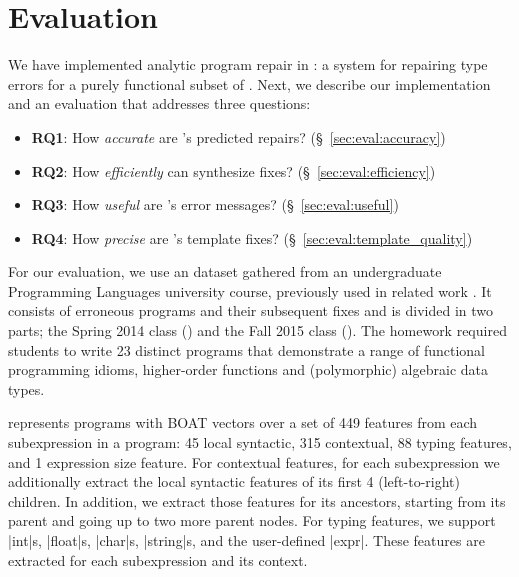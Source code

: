 \section{Evaluation}
\label{sec:eval}

\lstMakeShortInline[mathescape=true]{|}

We have implemented analytic program repair in \toolname: a system for
repairing type errors for a purely functional subset of \ocaml. Next,
we describe our implementation and an evaluation that addresses three
questions:

\begin{itemize}
    \item \textbf{RQ1}: How \emph{accurate} are \toolname's predicted repairs?
                        (\S~\ref{sec:eval:accuracy})
    \item \textbf{RQ2}: How \emph{efficiently} can \toolname synthesize fixes?
                        (\S~\ref{sec:eval:efficiency})
    \item \textbf{RQ3}: How \emph{useful} are \toolname's error messages?
                        (\S~\ref{sec:eval:useful})
    \item \textbf{RQ4}: How \emph{precise} are \toolname's template fixes?
                        (\S~\ref{sec:eval:template_quality})

\end{itemize}


%
For our evaluation, we use an \ocaml dataset gathered from an undergraduate
Programming Languages university course, previously used in related work
\citep{Seidel2017-ko,Seidel:2017}. It consists of erroneous programs and their
subsequent fixes and is divided in two parts; the Spring 2014 class (\SPRING)
and the Fall 2015 class (\FALL). The homework required students to write 23
distinct programs that demonstrate a range of functional programming idioms, \eg
higher-order functions and (polymorphic) algebraic data types.

%
\toolname represents programs with BOAT vectors over a set of 449
features from
each subexpression in a program: 45 local syntactic, 315
contextual, 88 typing features, and 1 expression size feature.
For contextual features, for each subexpression we
additionally extract the local syntactic features of its first 4
(left-to-right) children. In addition, we extract those features for its
ancestors, starting from its parent and going up to two more parent nodes.
For typing features, we support |int|s, |float|s, |char|s, |string|s, and
    the user-defined |expr|. These features are extracted for each
    subexpression and its context.
%

